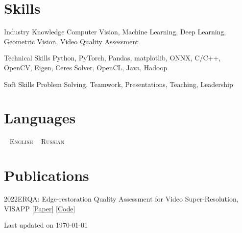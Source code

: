 \documentclass{tccv}
\newcommand{\updateinfo}[1][\today]{\par\vfill\hfill{\scriptsize\color{darkergray}Last updated on #1}}
\begin{document}
\section{Skills}

\begin{factlist}

\item{Industry Knowledge}
     {Computer Vision, Machine Learning, Deep Learning, Geometric Vision, Video Quality Assessment}

\item{Technical Skills}
     {Python, PyTorch, Pandas, matplotlib, ONNX, C/C++, OpenCV, Eigen, Ceres Solver, OpenCL, Java, Hadoop}

\item{Soft Skills}
     {Problem Solving, Teamwork, Presentations, Teaching, Leadership}

\end{factlist}

\section{Languages}

\faAngleDoubleRight~ \textsc{English}\qquad
\faAngleDoubleRight~ \textsc{Russian}

\section{Publications}

\begin{factlist}
     \item{2022}{ERQA: Edge-restoration Quality Assessment for Video Super-Resolution, VISAPP [\href{https://arxiv.org/abs/2110.09992}{Paper}] [\href{https://github.com/msu-video-group/ERQA}{Code}]}
\end{factlist}

\updateinfo
\end{document}
